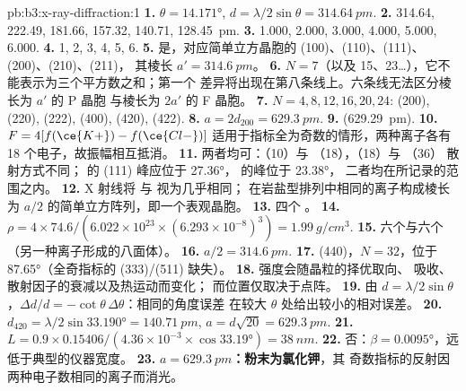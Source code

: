 \begin{solution}{pb:b3:x-ray-diffraction:1}
\textbf{1.} $\theta = \ang{14.171}$, $d = \lambda/2\sin\theta = \qty{314.64}{pm}$.
\textbf{2.} 314.64, 222.49, 181.66, 157.32, 140.71, \qty{128.45}{pm}.
\textbf{3.} 1.000, 2.000, 3.000, 4.000, 5.000, 6.000.
\textbf{4.} 1, 2, 3, 4, 5, 6.
\textbf{5.} 是，对应简单立方晶胞的 (100)、(110)、(111)、(200)、(210)、(211)，
其棱长 $a' = \qty{314.6}{pm}$。
\textbf{6.} $N = 7$（以及 15、23\dots），它不能表示为三个平方数之和；第一个
差异将出现在第八条线上。六条线无法区分棱长为 $a'$ 的 P 晶胞
与棱长为 $2a'$ 的 F 晶胞。
\textbf{7.} $N = 4, 8, 12, 16, 20, 24$: (200), (220), (222), (400), (420), (422).
\textbf{8.} $a = 2d_{200} = \qty{629.3}{pm}$.
\textbf{9.}  (\qty{629.29}{pm}).
\textbf{10.} $F = 4[f(\ce{K+}) - f(\ce{Cl-})]$ 适用于指标全为奇数的情形，两种离子各有 18
个电子，故振幅相互抵消。
\textbf{11.} 两者均可：（10）与 （18），（18）与 （36）
散射方式不同； 的 (111) 峰应位于 \ang{27.36}， 的峰位于 \ang{23.38}，
二者均在所记录的范围之内。
\textbf{12.} X 射线将  与  视为几乎相同；
在岩盐型排列中相同的离子构成棱长为 $a/2$ 的简单立方阵列，即一个表观晶胞。
\textbf{13.} 四个 。
\textbf{14.} $\rho = 4 \times 74.6/(6.022\times10^{23} \times (6.293\times10^{-8})^3) =
\qty{1.99}{g/cm^3}$.
\textbf{15.} 六个与六个（另一种离子形成的八面体）。
\textbf{16.} $a/2 = \qty{314.6}{pm}$.
\textbf{17.} (440)，$N = 32$，位于 \ang{87.65}（全奇指标的 (333)/(511) 缺失）。
\textbf{18.} 强度会随晶粒的择优取向、
吸收、散射因子的衰减以及热运动而变化；
而位置仅取决于点阵。
\textbf{19.} 由 $d = \lambda/2\sin\theta$，$\Delta d/d = -\cot\theta\,\Delta\theta$：相同的角度误差
在较大 $\theta$ 处给出较小的相对误差。
\textbf{20.} $d_{420} = \lambda/2\sin\ang{33.190} = \qty{140.71}{pm}$, $a = d\sqrt{20} =
\qty{629.3}{pm}$.
\textbf{21.} $L = 0.9 \times 0.15406/(4.36\times10^{-3} \times \cos\ang{33.19}) = \qty{38}{nm}$.
\textbf{22.} 否：$\beta = \ang{0.0095}$，远低于典型的仪器宽度。
\textbf{23.} \textbf{$a = \qty{629.3}{pm}$：粉末为氯化钾}，其
奇数指标的反射因两种电子数相同的离子而消光。
\end{solution}
